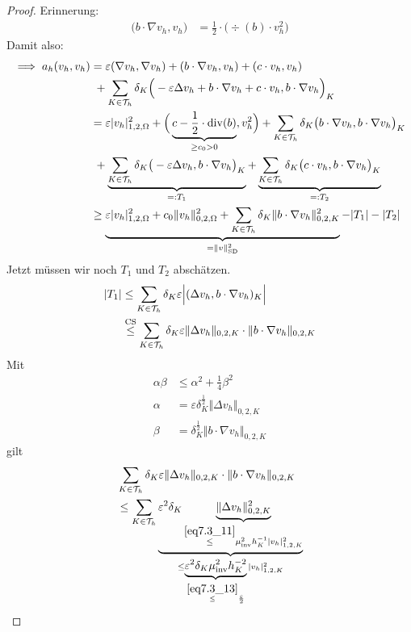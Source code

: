 \begin{proof}
	Erinnerung:
	\begin{align*}
		\big(b\cdot\nabla v_h,v_h\big)&=\frac{1}{2}\cdot\big(\div(b)\cdot v_h^2\big)
	\end{align*}
	Damit also:
	\begin{align*}
		\implies a_h(v_h,v_h)
		&=\varepsilon(\nabla v_h,\nabla v_h)+(b\cdot\nabla v_h,v_h)+(c \cdot v_h,v_h)\\
		&~+\sum\limits_{K\in\mathcal{T}_h}\delta_K\Big(-\varepsilon\Delta v_h+b\cdot\nabla v_h+c \cdot v_h,b\cdot\nabla v_h\Big)_K\\
		&=\varepsilon|v_h|^2_{1,2,\Omega}+\Big(\underbrace{c-\frac{1}{2}\cdot\operatorname{div}(b)}_{\geq c_0>0},v_h^2\Big)+\sum\limits_{K\in\mathcal{T}_h}\delta_K\big(b\cdot\nabla v_h,b\cdot \nabla v_h\big)_K\\
		&~+\underbrace{\sum\limits_{K\in\mathcal{T}_h}\delta_K\big(-\varepsilon\Delta v_h,b\cdot\nabla v_h\big)_K}_{=:T_1}
		+\underbrace{\sum\limits_{K\in\mathcal{T}_h}\delta_K\big(c \cdot v_h,b\cdot\nabla v_h\big)_K}_{=:T_2}\\
		&\geq\underbrace{\varepsilon|v_h|^2_{1,2,\Omega}+c_0\Vert v_h\Vert^2_{0,2,\Omega}+\sum\limits_{K\in\mathcal{T}_h}\delta_K\Vert b\cdot\nabla v_h\Vert^2_{0,2,K}}_{=\Vert v\Vert^2_{\text{SD}}}-|T_1|-|T_2|
	\end{align*}
	Jetzt müssen wir noch $T_1$ und $T_2$ abschätzen.
	\begin{align*}
		|T_1|
		&\leq\sum\limits_{K\in\mathcal{T}_h}\delta_K\varepsilon\Big|(\Delta v_h,b\cdot\nabla v_h)_K\Big| \\
		&\overset{\text{CS}}{\leq}
		\sum\limits_{K\in\mathcal{T}_h}\delta_K\varepsilon\Vert\Delta v_h\Vert_{0,2,K}\cdot\Vert b\cdot\nabla v_h\Vert_{0,2,K}\\
	\end{align*}
	Mit
	\begin{align*}
		\alpha\beta
		&\leq\alpha^2+\frac{1}{4}\beta^2\\
		\alpha&=\varepsilon\delta_K^{\frac{1}{2}}\Vert\Delta v_h\Vert_{0,2,K}\\
		\beta&=\delta_K^{\frac{1}{2}}\Vert b\cdot\nabla v_h\Vert_{0,2,K}
	\end{align*}
	gilt
	\begin{align*}
		&\sum\limits_{K\in\T_h}\delta_K\varepsilon\Vert\Delta v_h\Vert_{0,2,K}\cdot\Vert b\cdot\nabla v_h\Vert_{0,2,K} \\
		&\leq
		\sum\limits_{K\in\T_h}\underbrace{\varepsilon^2\delta_K\underbrace{\Vert\Delta v_h\Vert^2_{0,2,K}}_{\overset{\eqref{eq7.3_11}}{\leq}\mu^2_{\text{inv}} h_K^{-1}|v_h|^2_{1,2,K}}}_{\leq\underbrace{\varepsilon^2\delta_K\mu^2_{\text{inv}} h_K^{-2}}_{\overset{\eqref{eq7.3_13}}{\leq}\frac{\varepsilon}{2}}|v_h|^2_{1,2,K}}\\

\end{align*}
\end{proof}
